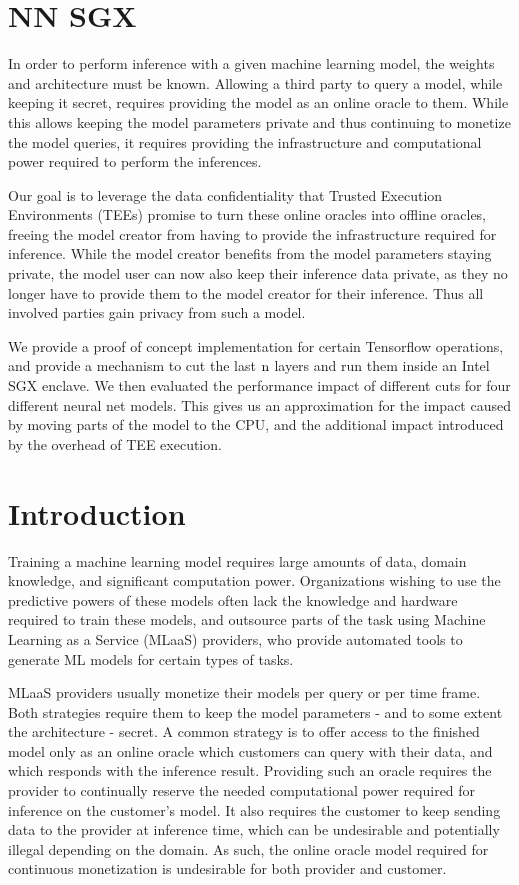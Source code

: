 \documentclass[11pt]{article}
\date{\today}
\title{}
\begin{document}
\tableofcontents

\section{NN SGX}
In order to perform inference with a given machine learning model, the weights and architecture must be known.
Allowing a third party to query a model, while keeping it secret, requires providing the model as an online oracle to them.
While this allows keeping the model parameters private and thus continuing to monetize the model queries, it requires providing the infrastructure and computational power required to perform the inferences.

Our goal is to leverage the data confidentiality that Trusted Execution Environments (TEEs) promise to turn these online oracles into offline oracles, freeing the model creator from having to provide the infrastructure required for inference.
While the model creator benefits from the model parameters staying private, the model user can now also keep their inference data private, as they no longer have to provide them to the model creator for their inference.
Thus all involved parties gain privacy from such a model.

We provide a proof of concept implementation for certain Tensorflow operations, and provide a mechanism to cut the last \($n$\) layers and run them inside an Intel SGX enclave.
We then evaluated the performance impact of different cuts for four different neural net models.
This gives us an approximation for the impact caused by moving parts of the model to the CPU, and the additional impact introduced by the overhead of TEE execution.

\section{Introduction}
\label{sec:introduction}


Training a machine learning model requires large amounts of data, domain knowledge, and significant computation power.
Organizations wishing to use the predictive powers of these models often lack the knowledge and hardware required to train these models, and outsource parts of the task using Machine Learning as a Service (MLaaS) providers, who provide automated tools to generate ML models for certain types of tasks.

MLaaS providers usually monetize their models per query or per time frame.
Both strategies require them to keep the model parameters - and to some extent the architecture - secret.
A common strategy is to offer access to the finished model only as an online oracle which customers can query with their data, and which responds with the inference result.
Providing such an oracle requires the provider to continually reserve the needed computational power required for inference on the customer's model.
It also requires the customer to keep sending data to the provider at inference time, which can be undesirable and potentially illegal depending on the domain.
As such, the online oracle model required for continuous monetization is undesirable for both provider and customer.
\end{document}
